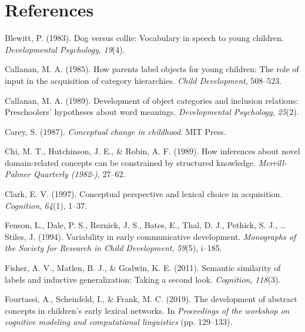 \documentclass[english,,man,floatsintext]{apa6}
\begin{document}
\hypertarget{references}{%
\section{References}\label{references}}

\setlength{\parindent}{-0.5in}
\setlength{\leftskip}{0.5in}

\hypertarget{refs}{}
\leavevmode\hypertarget{ref-blewitt1983}{}%
Blewitt, P. (1983). Dog versus collie: Vocabulary in speech to young children. \emph{Developmental Psychology}, \emph{19}(4).

\leavevmode\hypertarget{ref-callanan1985}{}%
Callanan, M. A. (1985). How parents label objects for young children: The role of input in the acquisition of category hierarchies. \emph{Child Development}, 508--523.

\leavevmode\hypertarget{ref-callanan1989}{}%
Callanan, M. A. (1989). Development of object categories and inclusion relations: Preschoolers' hypotheses about word meanings. \emph{Developmental Psychology}, \emph{25}(2).

\leavevmode\hypertarget{ref-carey1987}{}%
Carey, S. (1987). \emph{Conceptual change in childhood}. MIT Press.

\leavevmode\hypertarget{ref-chi1989}{}%
Chi, M. T., Hutchinson, J. E., \& Robin, A. F. (1989). How inferences about novel domain-related concepts can be constrained by structured knowledge. \emph{Merrill-Palmer Quarterly (1982-)}, 27--62.

\leavevmode\hypertarget{ref-clark1997}{}%
Clark, E. V. (1997). Conceptual perspective and lexical choice in acquisition. \emph{Cognition}, \emph{64}(1), 1--37.

\leavevmode\hypertarget{ref-fenson94}{}%
Fenson, L., Dale, P. S., Reznick, J. S., Bates, E., Thal, D. J., Pethick, S. J., \ldots{} Stiles, J. (1994). Variability in early communicative development. \emph{Monographs of the Society for Research in Child Development}, \emph{59}(5), i--185.

\leavevmode\hypertarget{ref-fisher2011}{}%
Fisher, A. V., Matlen, B. J., \& Godwin, K. E. (2011). Semantic similarity of labels and inductive generalization: Taking a second look. \emph{Cognition}, \emph{118}(3).

\leavevmode\hypertarget{ref-fourtassi2019}{}%
Fourtassi, A., Scheinfeld, I., \& Frank, M. C. (2019). The development of abstract concepts in children's early lexical networks. In \emph{Proceedings of the workshop on cognitive modeling and computational linguistics} (pp. 129--133).
\end{document}
